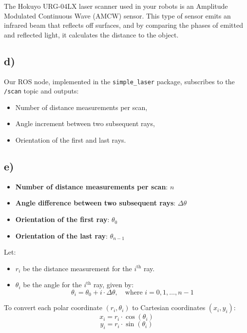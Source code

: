 \documentclass[template,12pt,a4paper,enabledeprecatedfontcommands]{template}
\begin{document}
The Hokuyo URG-04LX laser scanner used in your robots is an Amplitude Modulated Continuous Wave (AMCW) sensor. This type of sensor emits an infrared beam that reflects off surfaces, and by comparing the phases of emitted and reflected light, it calculates the distance to the object.

\subsection{d)}

Our ROS node, implemented in the \texttt{simple\_laser} package, subscribes to the \texttt{/scan} topic and outputs:
\begin{itemize}
    \item Number of distance measurements per scan,
    \item Angle increment between two subsequent rays,
    \item Orientation of the first and last rays.
\end{itemize}

\subsection{e)}

\begin{itemize}
    \item \textbf{Number of distance measurements per scan}: \( n \)
    \item \textbf{Angle difference between two subsequent rays}: \( \Delta \theta \)
    \item \textbf{Orientation of the first ray}: \( \theta_0 \)
    \item \textbf{Orientation of the last ray}: \( \theta_{n-1} \)
\end{itemize}

Let:
\begin{itemize}
    \item \( r_i \) be the distance measurement for the \( i^{\text{th}} \) ray.
    \item \( \theta_i \) be the angle for the \( i^{\text{th}} \) ray, given by:
    \[
    \theta_i = \theta_0 + i \cdot \Delta \theta, \quad \text{where } i = 0, 1, \ldots, n-1
    \]
\end{itemize}

To convert each polar coordinate \( (r_i, \theta_i) \) to Cartesian coordinates \( (x_i, y_i) \):
\[
x_i = r_i \cdot \cos(\theta_i)
\]
\[
y_i = r_i \cdot \sin(\theta_i)
\]
\end{document}
